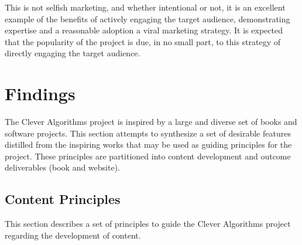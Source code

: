 \documentclass[a4paper, 11pt]{article}
\begin{document}
This is not selfish marketing, and whether intentional or not, it is an excellent example of the benefits of actively engaging the target audience, demonstrating expertise and a reasonable adoption a viral marketing strategy. It is expected that the popularity of the project is due, in no small part, to this strategy of directly engaging the target audience.

% 
% 
\section{Findings}
\label{sec:findings}
The Clever Algorithms project is inspired by a large and diverse set of books and software projects. This section attempts to synthesize a set of desirable features distilled from the inspiring works that may be used as guiding principles for the project. These principles are partitioned into content development and outcome deliverables (book and website).

\subsection{Content Principles}
This section describes a set of principles to guide the Clever Algorithms project regarding the development of content.
\end{document}
